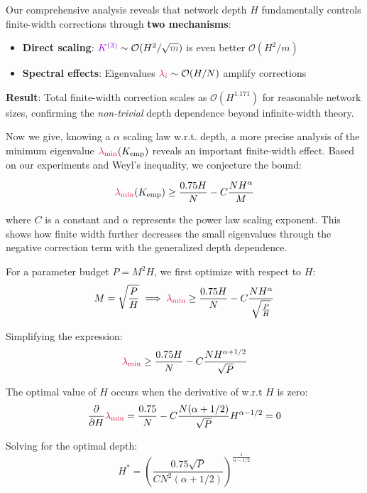\documentclass[a4paper]{article}
\newcommand{\m}{\textcolor{weightcolor}{m}}
\theoremstyle{plain}
\theoremstyle{definition}
\theoremstyle{remark}
\begin{document}
\begin{tcolorbox}[colback=blue!10,colframe=blue!60!black,title={\textbf{🎯 KEY INSIGHT: Depth-Dependent Scaling}},enhanced,drop shadow]
Our comprehensive analysis reveals that network depth $H$ fundamentally controls finite-width corrections through \textbf{two mechanisms}:

\begin{itemize}
\item \textbf{Direct scaling}: $\textcolor{k3color}{K^{(3)}} \sim \mathcal{O}(H^2/\sqrt{\m})$ is even better $\mathcal{O}(H^2/m)$
\item \textbf{Spectral effects}: Eigenvalues $\textcolor{kernelcolor}{\lambda_i} \sim \mathcal{O}(H/N)$ amplify corrections
\end{itemize}

\textbf{Result}: Total finite-width correction scales as $\mathcal{O}(H^{1.171})$ for reasonable network sizes, confirming the \textit{non-trivial} depth dependence beyond infinite-width theory.
\end{tcolorbox}

Now we give, knowing a $\alpha$ scaling law w.r.t. depth, a more precise analysis of the minimum eigenvalue $\textcolor{kernelcolor}{\lambda_{\min}}(K_{\text{emp}})$ reveals an important finite-width effect. Based on our experiments and Weyl's inequality, we conjecture the bound:

\[ \textcolor{kernelcolor}{\lambda_{\min}}(K_{\text{emp}}) \ge \frac{0.75H}{N} - C \frac{NH^\alpha}{M} \]

where $C$ is a constant and $\alpha$ represents the power law scaling exponent. This shows how finite width further decreases the small eigenvalues through the negative correction term with the generalized depth dependence.

For a parameter budget $P = M^2H$, we first optimize with respect to $H$:
\[
M = \sqrt{\frac{P}{H}} \implies \textcolor{kernelcolor}{\lambda_{\min}} \ge \frac{0.75H}{N} - C \frac{NH^\alpha}{\sqrt{\frac{P}{H}}} 
\]

Simplifying the expression:
\[
\textcolor{kernelcolor}{\lambda_{\min}} \ge \frac{0.75H}{N} - C \frac{NH^{\alpha + 1/2}}{\sqrt{P}}
\]

The optimal value of $H$ occurs when the derivative of w.r.t  $H$ is zero:
\[
\frac{\partial}{\partial H} \textcolor{kernelcolor}{\lambda_{\min}} = \frac{0.75}{N} - C \frac{N(\alpha + 1/2)}{\sqrt{P}} H^{\alpha - 1/2} = 0
\]

Solving for the optimal depth:
\[
H^* = \left(\frac{0.75\sqrt{P}}{CN^2(\alpha + 1/2)}\right)^{\frac{1}{\alpha - 1/2}}
\]
\end{document}
